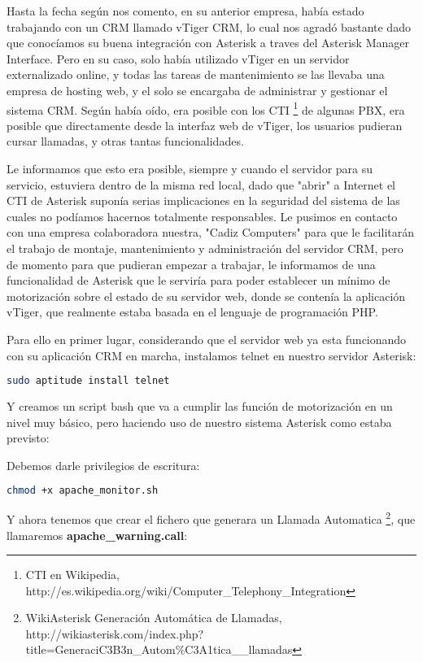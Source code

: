 Hasta la fecha según nos comento, en su anterior empresa, había estado trabajando con un CRM llamado vTiger CRM, lo cual nos agradó bastante dado que conocíamos su buena integración con Asterisk a traves del Asterisk Manager Interface. Pero en su caso, solo había utilizado vTiger en un servidor externalizado online, y todas las tareas de mantenimiento se las llevaba una empresa de hosting web, y el solo se encargaba de administrar y gestionar el sistema CRM. Según había oído, era posible con los CTI \footnote{CTI en Wikipedia, http://es.wikipedia.org/wiki/Computer_Telephony_Integration} de algunas PBX, era posible que directamente desde la interfaz web de vTiger, los usuarios pudieran cursar llamadas, y otras tantas funcionalidades.

Le informamos que esto era posible, siempre y cuando el servidor para su servicio, estuviera dentro de la misma red local, dado que "abrir" a Internet el CTI de Asterisk suponía serias implicaciones en la seguridad del sistema de las cuales no podíamos hacernos totalmente responsables. Le pusimos en contacto con una empresa colaboradora nuestra, "Cadiz Computers" para que le facilitarán el trabajo de montaje, mantenimiento y administración del servidor CRM, pero de momento para que pudieran empezar a trabajar, le informamos de una funcionalidad de Asterisk que le serviría para poder establecer un mínimo de motorización sobre el estado de su servidor web, donde se contenía la aplicación vTiger, que realmente estaba basada en el lenguaje de programación PHP.

Para ello en primer lugar, considerando que el servidor web ya esta funcionando con su aplicación CRM en marcha, instalamos telnet en nuestro servidor Asterisk:

\begin{lstlisting}[language=sh]
sudo aptitude install telnet
\end{lstlisting}

Y creamos un script bash que va a cumplir las función de motorización en un nivel muy básico, pero haciendo uso de nuestro sistema Asterisk como estaba previsto:



Debemos darle privilegios de escritura:

\begin{lstlisting}[language=sh]
chmod +x apache_monitor.sh
\end{lstlisting}

Y ahora tenemos que crear el fichero que generara un Llamada Automatica \footnote{WikiAsterisk Generación Automática de Llamadas, http://wikiasterisk.com/index.php?title=GeneraciC3B3n\_Autom\%C3A1tica\_\de\_llamadas}, que llamaremos \textbf{apache_warning.call}:

